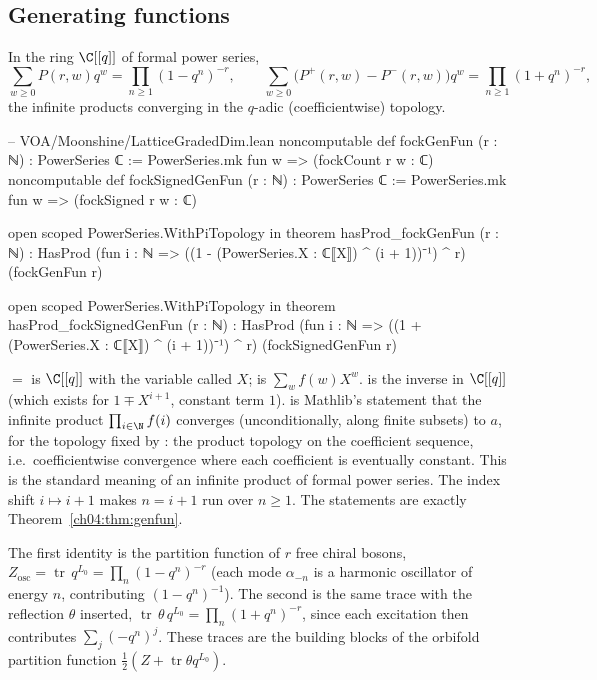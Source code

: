 \subsection{Generating functions}

\begin{theorem}\label{ch04:thm:genfun}
In the ring $\C[[q]]$ of formal power series,
\begin{equation*}
  \sum_{w\ge0}P(r,w)q^w=\prod_{n\ge1}(1-q^n)^{-r},
  \qquad
  \sum_{w\ge0}\big(P^+(r,w)-P^-(r,w)\big)q^w=\prod_{n\ge1}(1+q^n)^{-r},
\end{equation*}
the infinite products converging in the $q$-adic (coefficientwise) topology.
\end{theorem}

\begin{leancode}
-- VOA/Moonshine/LatticeGradedDim.lean
noncomputable def fockGenFun (r : ℕ) : PowerSeries ℂ := PowerSeries.mk fun w => (fockCount r w : ℂ)
noncomputable def fockSignedGenFun (r : ℕ) : PowerSeries ℂ :=
  PowerSeries.mk fun w => (fockSigned r w : ℂ)

open scoped PowerSeries.WithPiTopology in
theorem hasProd_fockGenFun (r : ℕ) :
    HasProd (fun i : ℕ => ((1 - (PowerSeries.X : ℂ⟦X⟧) ^ (i + 1))⁻¹) ^ r) (fockGenFun r)

open scoped PowerSeries.WithPiTopology in
theorem hasProd_fockSignedGenFun (r : ℕ) :
    HasProd (fun i : ℕ => ((1 + (PowerSeries.X : ℂ⟦X⟧) ^ (i + 1))⁻¹) ^ r)
      (fockSignedGenFun r)
\end{leancode}

\begin{dictionary}
 $=$  is $\C[[q]]$ with the variable called $X$;
 is $\sum_w f(w)X^w$.  is the inverse in $\C[[q]]$ (which exists for
$1\mp X^{i+1}$, constant term $1$).  is Mathlib's statement that the infinite
product $\prod_{i\in\N}f(i)$ converges (unconditionally, along finite subsets) to $a$, for the
topology fixed by : the product topology on the
coefficient sequence, i.e.\ coefficientwise convergence where each coefficient is eventually
constant. This is the standard meaning of an infinite product of formal power series. The index
shift $i\mapsto i+1$ makes $n=i+1$ run over $n\ge1$. The statements are exactly
Theorem~\ref{ch04:thm:genfun}.
\end{dictionary}

\begin{physics}
The first identity is the partition function of $r$ free chiral bosons, $Z_{\mathrm{osc}}=\operatorname{tr}\,q^{L_0}=\prod_n(1-q^n)^{-r}$ (each mode $\alpha_{-n}$ is a harmonic oscillator of energy $n$, contributing $(1-q^n)^{-1}$). The second is the same trace with the reflection $\theta$ inserted, $\operatorname{tr}\,\theta\,q^{L_0}=\prod_n(1+q^n)^{-r}$, since each excitation then contributes $\sum_j(-q^n)^j$. These traces are the building blocks of the orbifold partition function $\tfrac12(Z+\operatorname{tr}\theta q^{L_0})$.
\end{physics}

